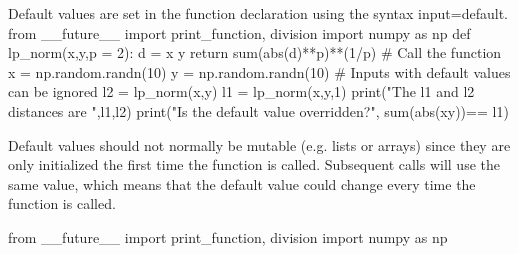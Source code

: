 
Default values are set in the function declaration using the syntax input=default.
from __future__ import print_function, division
import numpy as np
def lp_norm(x,y,p = 2):
d = x y
return sum(abs(d)**p)**(1/p)
# Call the function
x = np.random.randn(10)
y = np.random.randn(10)
# Inputs with default values can be ignored
l2 = lp_norm(x,y)
l1 = lp_norm(x,y,1)
print("The l1 and l2 distances are ",l1,l2)
print("Is the default value overridden?", sum(abs(xy))==
l1)

Default values should not normally be mutable (e.g. lists or arrays) since they are only initialized the first
time the function is called. Subsequent calls will use the same value, which means that the default value
could change every time the function is called.

from __future__ import print_function, division
import numpy as np

